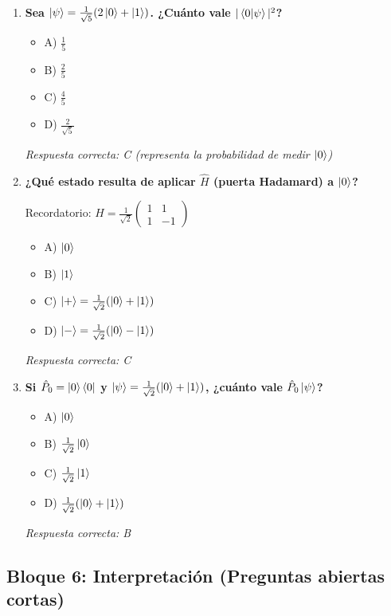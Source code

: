 \documentclass{unirTema}
\begin{document}
\begin{enumerate}
  \item \textbf{Sea $\ket{\psi} = \frac{1}{\sqrt{5}}(2\ket{0} + \ket{1})$. ¿Cuánto vale $|\braket{0}{\psi}|^2$?}
        \begin{itemize}
          \item A) $\frac{1}{5}$
          \item B) $\frac{2}{5}$
          \item C) $\frac{4}{5}$
          \item D) $\frac{2}{\sqrt{5}}$
        \end{itemize}
        \textit{Respuesta correcta: C (representa la probabilidad de medir $\ket{0}$)}

  \item \textbf{¿Qué estado resulta de aplicar $\hat{H}$ (puerta Hadamard) a $\ket{0}$?}

        Recordatorio: $\hat{H} = \frac{1}{\sqrt{2}}\begin{pmatrix} 1 & 1 \\ 1 & -1 \end{pmatrix}$
        \begin{itemize}
          \item A) $\ket{0}$
          \item B) $\ket{1}$
          \item C) $\ket{+} = \frac{1}{\sqrt{2}}(\ket{0} + \ket{1})$
          \item D) $\ket{-} = \frac{1}{\sqrt{2}}(\ket{0} - \ket{1})$
        \end{itemize}
        \textit{Respuesta correcta: C}

  \item \textbf{Si $\hat{P}_0 = \ket{0}\bra{0}$ y $\ket{\psi} = \frac{1}{\sqrt{2}}(\ket{0} + \ket{1})$, ¿cuánto vale $\hat{P}_0\ket{\psi}$?}
        \begin{itemize}
          \item A) $\ket{0}$
          \item B) $\frac{1}{\sqrt{2}}\ket{0}$
          \item C) $\frac{1}{\sqrt{2}}\ket{1}$
          \item D) $\frac{1}{\sqrt{2}}(\ket{0} + \ket{1})$
        \end{itemize}
        \textit{Respuesta correcta: B}
\end{enumerate}

\subsection*{Bloque 6: Interpretación (Preguntas abiertas cortas)}
\end{document}
